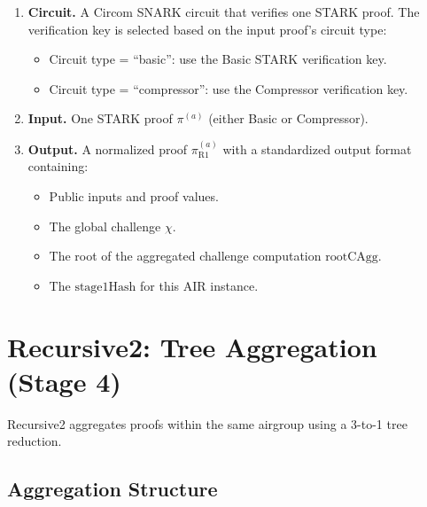 \begin{enumerate}[label=(\roman*)]
  \item \textbf{Circuit.}
        A Circom SNARK circuit that verifies one STARK proof.
        The verification key is selected based on the input proof's circuit type:
        \begin{itemize}[nosep]
          \item Circuit type = ``basic'': use the Basic STARK verification key.
          \item Circuit type = ``compressor'': use the Compressor verification key.
        \end{itemize}

  \item \textbf{Input.}
        One STARK proof $\pi^{(a)}$ (either Basic or Compressor).

  \item \textbf{Output.}
        A normalized proof $\pi^{(a)}_{\mathrm{R1}}$ with a standardized
        output format containing:
        \begin{itemize}[nosep]
          \item Public inputs and proof values.
          \item The global challenge $\chi$.
          \item The root of the aggregated challenge computation $\mathrm{rootCAgg}$.
          \item The $\mathrm{stage1Hash}$ for this AIR instance.
        \end{itemize}
\end{enumerate}

\section{Recursive2: Tree Aggregation (Stage 4)}
\label{sec:recursive2}

Recursive2 aggregates proofs within the same airgroup using a 3-to-1
tree reduction.

\subsection{Aggregation Structure}
\label{sec:r2-structure}

